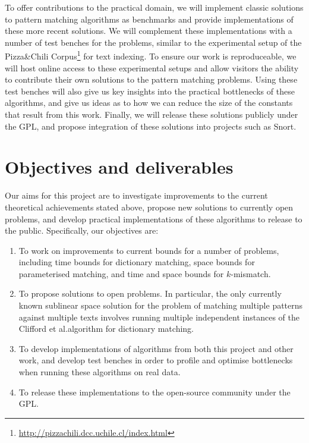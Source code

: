 \documentclass[a4paper,11pt]{article}
\begin{document}
    To offer contributions to the practical domain, we will implement classic solutions to pattern matching algorithms as benchmarks and provide implementations of these more recent solutions. We will complement these implementations with a number of test benches for the problems, similar to the experimental setup of the Pizza\&Chili Corpus\footnote{\url{http://pizzachili.dcc.uchile.cl/index.html}} for text indexing. To ensure our work is reproduceable, we will host online access to these experimental setups and allow visitors the ability to contribute their own solutions to the pattern matching problems. Using these test benches will also give us key insights into the practical bottlenecks of these algorithms, and give us ideas as to how we can reduce the size of the constants that result from this work. Finally, we will release these solutions publicly under the GPL, and propose integration of these solutions into projects such as Snort.

    \section{Objectives and deliverables}

    Our aims for this project are to investigate improvements to the current theoretical achievements stated above, propose new solutions to currently open problems, and develop practical implementations of these algorithms to release to the public. Specifically, our objectives are:

    \begin{enumerate}
        \item To work on improvements to current bounds for a number of problems, including time bounds for dictionary matching, space bounds for parameterised matching, and time and space bounds for $k$-mismatch.
        \item To propose solutions to open problems. In particular, the only currently known sublinear space solution for the problem of matching multiple patterns against multiple texts involves running multiple independent instances of the Clifford et al.\@ algorithm for dictionary matching.
        \item To develop implementations of algorithms from both this project and other work, and develop test benches in order to profile and optimise bottlenecks when running these algorithms on real data.
        \item To release these implementations to the open-source community under the GPL.
    \end{enumerate}
\end{document}
